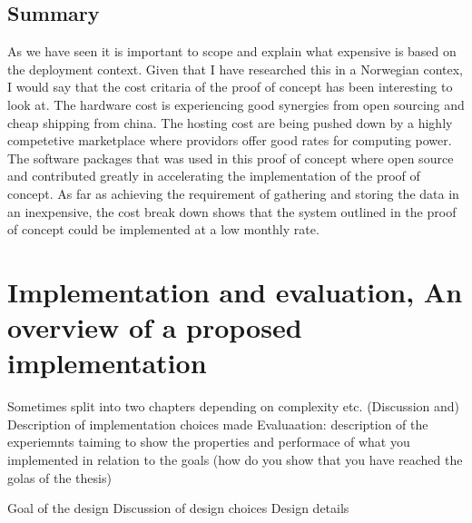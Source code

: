 \documentclass[]{uiophd}
\begin{document}
\section{Summary}
As we have seen it is important to scope and explain what expensive is based on the deployment context. Given that I have researched this in a Norwegian contex, I would say that the cost critaria of the proof of concept has been interesting to look at. The hardware cost is experiencing good synergies from open sourcing and cheap shipping from china. The hosting cost are being pushed down by a highly competetive marketplace where providors offer good rates for computing power. The software packages that was used in this proof of concept where open source and contributed greatly in accelerating the implementation of the proof of concept. As far as achieving the requirement of gathering and storing the data in an inexpensive, the cost break down shows that the system outlined in the proof of concept could be implemented at a low monthly rate.


\chapter{Implementation and evaluation, An overview of a proposed implementation}

Sometimes split into two chapters depending on complexity etc.
(Discussion and) Description of implementation choices made 
Evaluaation: description of the experiemnts taiming to show the properties 
and performace of what you implemented in relation to the goals (how do you show that you have reached the golas of the thesis)

Goal of the design
Discussion of design choices
Design details
\end{document}
